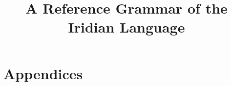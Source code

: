 \documentclass[10pt,a5paper]{book}
\begin{document}
\author{}
\title{A Reference Grammar of the Iridian Language}
\date{}

\frontmatter
\maketitle


\tableofcontents

\cleardoublepage

\listoftables
\listoffigures


\mainmatter


\appendix
\part*{Appendices}



\cleardoublepage
\nocite{*}
\printbibliography

\cleardoublepage
\printindex
\cleardoublepage
\end{document}
